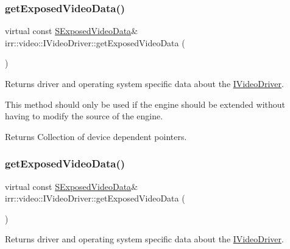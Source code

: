 \subsubsection{\texorpdfstring{get\+Exposed\+Video\+Data()}{getExposedVideoData()}\hspace{0.1cm}{\footnotesize\ttfamily [1/2]}}
{\footnotesize\ttfamily virtual const \hyperlink{structirr_1_1video_1_1SExposedVideoData}{S\+Exposed\+Video\+Data}\& irr\+::video\+::\+I\+Video\+Driver\+::get\+Exposed\+Video\+Data (\begin{DoxyParamCaption}{ }\end{DoxyParamCaption})\hspace{0.3cm}{\ttfamily [pure virtual]}}



Returns driver and operating system specific data about the \hyperlink{classirr_1_1video_1_1IVideoDriver}{I\+Video\+Driver}. 

This method should only be used if the engine should be extended without having to modify the source of the engine. \begin{DoxyReturn}{Returns}
Collection of device dependent pointers. 
\end{DoxyReturn}
\mbox{\label{classirr_1_1video_1_1IVideoDriver_a4f3535b2125e654e2e9645745e50cc49}} 
\subsubsection{\texorpdfstring{get\+Exposed\+Video\+Data()}{getExposedVideoData()}\hspace{0.1cm}{\footnotesize\ttfamily [2/2]}}
{\footnotesize\ttfamily virtual const \hyperlink{structirr_1_1video_1_1SExposedVideoData}{S\+Exposed\+Video\+Data}\& irr\+::video\+::\+I\+Video\+Driver\+::get\+Exposed\+Video\+Data (\begin{DoxyParamCaption}{ }\end{DoxyParamCaption})\hspace{0.3cm}{\ttfamily [pure virtual]}}



Returns driver and operating system specific data about the \hyperlink{classirr_1_1video_1_1IVideoDriver}{I\+Video\+Driver}. 

